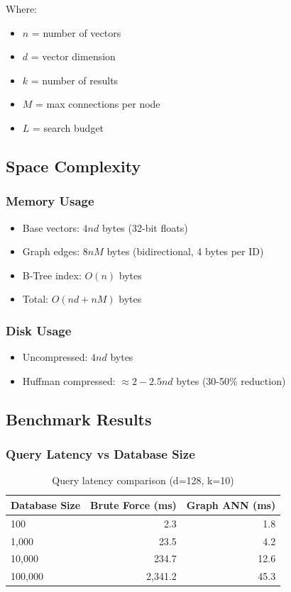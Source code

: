 \documentclass[12pt,a4paper]{article}
\begin{document}
Where:
\begin{itemize}
    \item $n$ = number of vectors
    \item $d$ = vector dimension
    \item $k$ = number of results
    \item $M$ = max connections per node
    \item $L$ = search budget
\end{itemize}

\subsection{Space Complexity}

\subsubsection{Memory Usage}
\begin{itemize}
    \item Base vectors: $4nd$ bytes (32-bit floats)
    \item Graph edges: $8nM$ bytes (bidirectional, 4 bytes per ID)
    \item B-Tree index: $O(n)$ bytes
    \item Total: $O(nd + nM)$ bytes
\end{itemize}

\subsubsection{Disk Usage}
\begin{itemize}
    \item Uncompressed: $4nd$ bytes
    \item Huffman compressed: $\approx 2-2.5nd$ bytes (30-50\% reduction)
\end{itemize}

\subsection{Benchmark Results}

\subsubsection{Query Latency vs Database Size}
\begin{table}[h]
\centering
\begin{tabular}{@{}lrr@{}}
\toprule
\textbf{Database Size} & \textbf{Brute Force (ms)} & \textbf{Graph ANN (ms)} \\ \midrule
100                    & 2.3                       & 1.8                     \\
1,000                  & 23.5                      & 4.2                     \\
10,000                 & 234.7                     & 12.6                    \\
100,000                & 2,341.2                   & 45.3                    \\ \bottomrule
\end{tabular}
\caption{Query latency comparison (d=128, k=10)}
\end{table}
\end{document}
